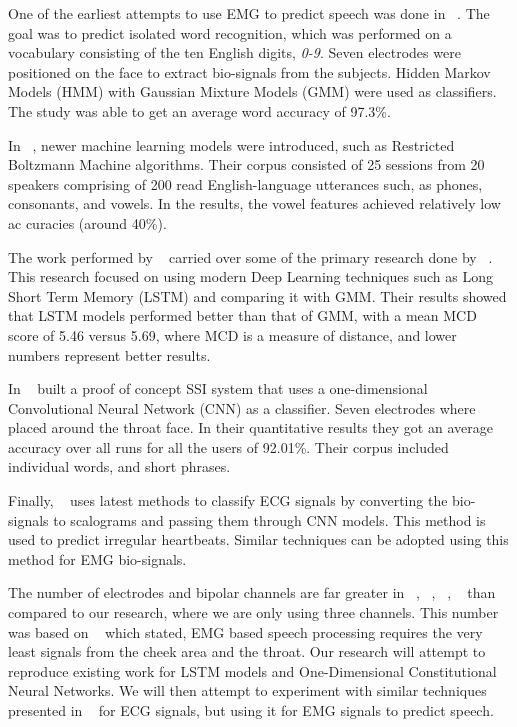 \documentclass[conference]{IEEEtran}
\begin{document}
One of the earliest attempts to use EMG to predict speech was done in ~\cite{maier-hein_session_2005}. The goal was to predict isolated word recognition,
which was performed on a vocabulary consisting of the ten English digits, \textit{0-9}. Seven electrodes were positioned on the face to extract bio-signals from the subjects. Hidden Markov Models (HMM) with Gaussian Mixture Models (GMM)  were used as
classifiers. The study was able to get an average word accuracy of 97.3\%. 

In ~\cite{wand_pattern_2014}, newer machine learning models were introduced, such as
Restricted Boltzmann Machine algorithms. Their corpus consisted of 25 sessions from
20 speakers comprising of 200 read English-language utterances such, as phones,
consonants, and vowels. In the results, the vowel features achieved relatively low
ac curacies (around 40\%).

The work performed by ~\cite{janke_emg--speech:_2017} carried over some of the primary
research done by ~\cite{wand_pattern_2014}. This research focused on using modern
Deep Learning techniques such as Long Short Term Memory (LSTM) and comparing it with
GMM. Their results showed that LSTM models performed better than that of GMM, with a
mean MCD score of 5.46 versus 5.69, where MCD is a measure of distance, and lower numbers
represent better results. 

In ~\cite{kapur_alterego:_2018} built a proof of concept SSI system that uses
a one-dimensional Convolutional Neural Network (CNN) as a classifier. Seven electrodes
where placed around the throat face. In their quantitative results they got an average accuracy over
all runs for all the users of 92.01\%. Their corpus included individual words, and short
phrases.

Finally, ~\cite{noauthor_classify_nodate} uses latest methods to classify ECG signals by
converting the bio-signals to scalograms and passing them through CNN models. This method is used
to predict irregular heartbeats. Similar techniques can be adopted using this method for EMG
bio-signals. 

The number of electrodes and bipolar channels are far greater in ~\cite{kapur_alterego:_2018},
~\cite{wand_pattern_2014}, ~\cite{janke_emg--speech:_2017}, ~\cite{maier-hein_session_2005} than 
compared to our research, where we are only using three channels. This number was based on 
~\cite{maier-hein_session_2005} which stated, EMG based speech processing requires the very 
least signals from the cheek area and the throat. Our research will attempt to reproduce existing work 
for LSTM models and One-Dimensional Constitutional Neural Networks. We will then attempt to 
experiment with similar techniques presented in ~\cite{noauthor_classify_nodate} for ECG signals, 
but using it for EMG signals to predict speech.
\end{document}
